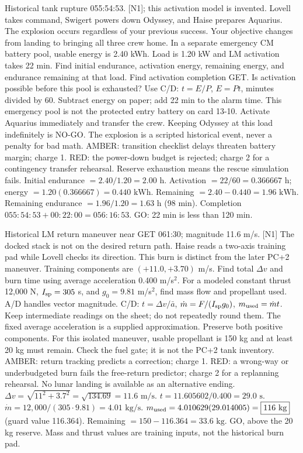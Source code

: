 {Historical tank rupture 055:54:53. [N1]; this activation model is invented.}
{Lovell takes command, Swigert powers down Odyssey, and Haise prepares
Aquarius. The explosion occurs regardless of your previous success.
Your objective changes from landing to bringing all three crew home.}
{In a separate emergency CM battery pool, usable energy is 2.40 kWh.
Load is 1.20 kW and LM activation takes 22 min.
Find initial endurance, activation energy, remaining energy,
and endurance remaining at that load. Find activation completion GET.
Is activation possible before this pool is exhausted?}
{Use C/D: \(t=E/P\), \(E=Pt\), minutes divided by 60.
Subtract energy on paper; add 22 min to the alarm time.
This emergency pool is not the protected entry battery on card 13-10.}
{Activate Aquarius immediately and transfer the crew.
Keeping Odyssey at this load indefinitely is NO-GO.
The explosion is a scripted historical event, never a penalty for bad math.}
{AMBER: transition checklist delays threaten battery margin; charge 1.
RED: the power-down budget is rejected; charge 2 for a contingency
transfer rehearsal. Reserve exhaustion means the rescue simulation fails.}
{Initial endurance \(=2.40/1.20=\boxed{2.00\text{ h}}\).
Activation \(=22/60=0.366667\) h;
energy \(=1.20(0.366667)=\boxed{0.440\text{ kWh}}\).
Remaining \(=2.40-0.440=\boxed{1.96\text{ kWh}}\).
Remaining endurance \(=1.96/1.20=\boxed{1.63\text{ h}}\)
(98 min).
Completion \(055{:}54{:}53+00{:}22{:}00
=\boxed{056{:}16{:}53}\).
\(\boxed{\text{GO}}\): 22 min is less than 120 min.}

{Historical LM return maneuver near GET 061:30; magnitude 11.6 m/s. [N1]}
{The docked stack is not on the desired return path.
Haise reads a two-axis training pad while Lovell checks its direction.
This burn is distinct from the later PC+2 maneuver.}
{Training components are \((+11.0,+3.70)\) m/s.
Find total \(\Delta v\) and burn time using average acceleration
0.400 m/s\(^{2}\).
For a modeled constant thrust 12,000 N, \(I_{\rm sp}=305\) s,
and \(g_0=9.81\) m/s\(^{2}\), find mass flow and propellant used.}
{A/D handles vector magnitude. C/D:
\(t=\Delta v/\bar a\),
\(\dot m=F/(I_{\rm sp}g_0)\), \(m_{\rm used}=\dot m t\).
Keep intermediate readings on the sheet; do not repeatedly round them.
The fixed average acceleration is a supplied approximation.}
{Preserve both positive components. For this isolated maneuver,
usable propellant is 150 kg and at least 20 kg must remain.
Check the fuel gate; it is not the PC+2 tank inventory.}
{AMBER: return tracking predicts a correction; charge 1.
RED: a wrong-way or underbudgeted burn fails the free-return
predictor; charge 2 for a replanning rehearsal. No lunar landing is
available as an alternative ending.}
{\(\Delta v=\sqrt{11^2+3.7^2}
=\sqrt{134.69}=\boxed{11.6\text{ m/s}}\).
\(t=11.605602/0.400=\boxed{29.0\text{ s}}\).
\(\dot m=12{,}000/(305\cdot9.81)
=\boxed{4.01\text{ kg/s}}\).
\(m_{\rm used}=4.010629(29.014005)
=\boxed{116\text{ kg}}\) (guard value 116.364).
Remaining \(=150-116.364=\boxed{33.6\text{ kg}}\).
\(\boxed{\text{GO}}\), above the 20 kg reserve.
Mass and thrust values are training inputs, not the historical burn pad.}

